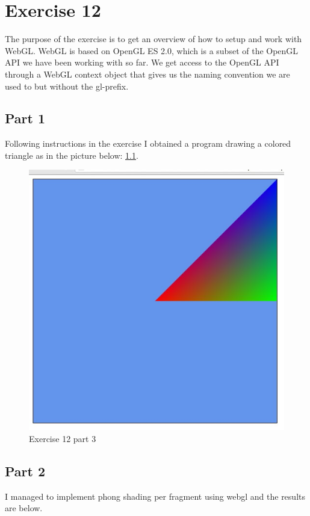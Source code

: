 \chapter{Exercise 12}
The purpose of the exercise is to get an overview of how to setup and work with WebGL. 
WebGL is based on OpenGL ES 2.0, which is a subset of the OpenGL API we have been 
working with so far. We get access to the OpenGL API through a WebGL context object 
that gives us the naming convention we are used to but without the gl-prefix.

\section{Part 1}
Following instructions in the exercise I obtained a program drawing a colored triangle
as in the picture below: \ref{fig:exercise_12_part_3}.
\begin{figure}[ht!]
	\begin{center}
		\includegraphics[width=.6\textwidth]{figures/exercise_12_part_3}
	\end{center}
	\vspace{-4.5ex}\caption{Exercise 12 part 3}
	\label{fig:exercise_12_part_3} 
\end{figure}

\section{Part 2}
I managed to implement phong shading per fragment using webgl and the results are below.

